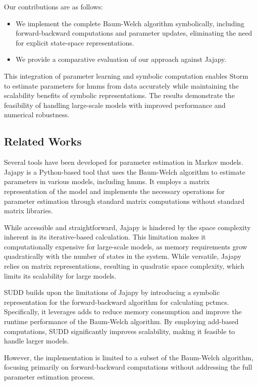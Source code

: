 Our contributions are as follows:
\begin{itemize}
    \item We implement the complete Baum-Welch algorithm symbolically, including forward-backward computations and parameter updates, eliminating the need for explicit state-space representations.
    \item We provide a comparative evaluation of our approach against Jajapy.
\end{itemize}

This integration of parameter learning and symbolic computation enables Storm to estimate parameters for \glspl{hmm} from data accurately while maintaining the scalability benefits of symbolic representations.
The results demonstrate the feasibility of handling large-scale models with improved performance and numerical robustness.

\subsection{Related Works}\label{subsec:related-works}
Several tools have been developed for parameter estimation in Markov models. 
Jajapy is a Python-based tool that uses the Baum-Welch algorithm to estimate parameters in various models, including \glspl{hmm}. 
It employs a matrix representation of the model and implements the necessary operations for parameter estimation through standard matrix computations without standard matrix libraries.

While accessible and straightforward, Jajapy is hindered by the space complexity inherent in its iterative-based calculation.
This limitation makes it computationally expensive for large-scale models, as memory requirements grow quadratically with the number of states in the system.
While versatile, Jajapy relies on matrix representations, resulting in quadratic space complexity, which limits its scalability for large models.

SUDD builds upon the limitations of Jajapy by introducing a symbolic representation for the forward-backward algorithm for calculating \glspl{pctmc}.
Specifically, it leverages \glspl{add} to reduce memory consumption and improve the runtime performance of the Baum-Welch algorithm.
By employing \gls{add}-based computations, SUDD significantly improves scalability, making it feasible to handle larger models.

However, the implementation is limited to a subset of the Baum-Welch algorithm, focusing primarily on forward-backward computations without addressing the full parameter estimation process. 


